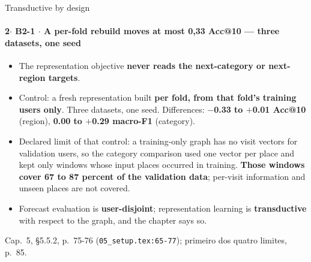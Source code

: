 \documentclass{beamer}
\begin{document}
\begin{frame}[noframenumbering]{Transductive by design}
    \framesubtitle{\normalsize 2$\cdot$ \textbf{B2-1} $\cdot$ A per-fold rebuild moves at most 0,33 Acc@10 — three datasets, one seed}
    \hypertarget{b21}{}
    \small
    \begin{itemize}\setlength{\itemsep}{0pt}\setlength{\parskip}{0pt}
        \item The representation objective \textbf{never reads the next-category or next-region targets}.
        \item Control: a fresh representation built \textbf{per fold, from that fold's training users only}. Three datasets, one seed. Differences: \textbf{$-$0.33 to $+$0.01 Acc@10} (region), \textbf{0.00 to $+$0.29 macro-F1} (category).
        \item Declared limit of that control: a training-only graph has no visit vectors for validation users, so the category comparison used one vector per place and kept only windows whose input places occurred in training. \textbf{Those windows cover 67 to 87 percent of the validation data}; per-visit information and unseen places are not covered.
        \item Forecast evaluation is \textbf{user-disjoint}; representation learning is \textbf{transductive} with respect to the graph, and the chapter says so.
    \end{itemize}
    \vfill
    {\scriptsize
    \begin{minipage}[b]{0.775\linewidth}\raggedright\textcolor{black!70}{Cap.~5, §5.5.2, p.~75-76 (\texttt{05\_setup.tex:65-77}); primeiro dos quatro limites, p.~85.}\end{minipage}\hfill
    \begin{minipage}[b]{0.20\linewidth}\raggedleft \hyperlink{b0}{}\end{minipage}}
\end{frame}
\end{document}
